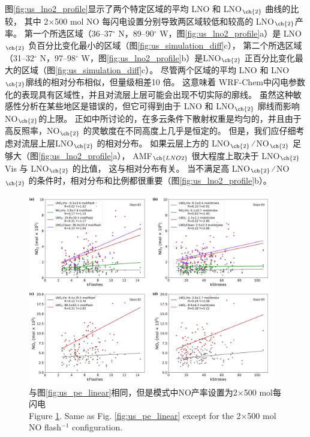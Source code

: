 图\ref{fig:us_lno2_profile}显示了两个特定区域的平均 LNO 和 LNO$_{\ch{2}}$ 曲线的比较，
其中 2$\times$500 mol NO 每闪电设置分别导致两区域较低和较高的 LNO$_{\ch{2}}$产率。
第一个所选区域（36--37$^{\circ}$ N，89--90$^{\circ}$ W，图\ref{fig:us_lno2_profile}a）是 LNO$_{\ch{2}}$ 负百分比变化最小的区域（图\ref{fig:us_simulation_diff}c），
第二个所选区域（31--32$^{\circ}$ N，97--98$^{\circ}$ W，图\ref{fig:us_lno2_profile}b）是LNO$_{\ch{2}}$ 正百分比变化最大的区域（图\ref{fig:us_simulation_diff}c）。
尽管两个区域的平均 LNO 和 LNO$_{\ch{2}}$廓线的相对分布相似，但量级相差10 倍。
这意味着 WRF-Chem中闪电参数化的表现具有区域性，并且对流层上层可能会出现不切实际的廓线。
虽然这种敏感性分析在某些地区是错误的，但它可得到由于 LNO 和 LNO$_{\ch{2}}$ 廓线而影响NO$_{\ch{2}}$的上限。
正如\citet{Laughner.2017}中所讨论的，在多云条件下散射权重是均匀的，并且由于高反照率，NO$_{\ch{2}}$ 的灵敏度在不同高度上几乎是恒定的。
但是，我们应仔细考虑对流层上层LNO$_{\ch{2}}$ 的相对分布。
如果云层上方的 LNO$_{\ch{2}}$ ∕ NO$_{\ch{2}}$ 足够大（图\ref{fig:us_lno2_profile}a），
AMF$_{\ch{LNO2}}$ 很大程度上取决于 LNO$_{\ch{2}}$Vis 与 LNO$_{\ch{2}}$ 的比值，
这与相对分布有关。
当不满足高 LNO$_{\ch{2}}$ ∕ NO$_{\ch{2}}$ 的条件时，相对分布和比例都很重要（图\ref{fig:us_lno2_profile}b）。

\begin{figure}[H]
\centering
\includegraphics[width=0.95\textwidth]{./figures/us_pe_linear_2x500.png}
\caption{与图\ref{fig:us_pe_linear}相同，但是模式中NO产率设置为2$\times$500 mol每闪电 \\Figure \ref{fig:us_pe_linear_2x500}. Same as Fig. \ref{fig:us_pe_linear} except for the 2$\times$500 mol NO flash$^{-1}$ configuration.}
\label{fig:us_pe_linear_2x500}
\end{figure}

